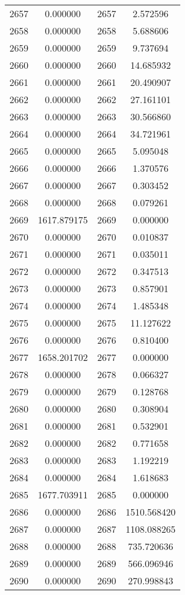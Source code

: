 \documentclass[12pt]{article}
\begin{document}
\begin{longtable}{@{}cccc@{}}
2657 & 0.000000 & 2657 & 2.572596 \\
2658 & 0.000000 & 2658 & 5.688606 \\
2659 & 0.000000 & 2659 & 9.737694 \\
2660 & 0.000000 & 2660 & 14.685932 \\
2661 & 0.000000 & 2661 & 20.490907 \\
2662 & 0.000000 & 2662 & 27.161101 \\
2663 & 0.000000 & 2663 & 30.566860 \\
2664 & 0.000000 & 2664 & 34.721961 \\
2665 & 0.000000 & 2665 & 5.095048 \\
2666 & 0.000000 & 2666 & 1.370576 \\
2667 & 0.000000 & 2667 & 0.303452 \\
2668 & 0.000000 & 2668 & 0.079261 \\
2669 & 1617.879175 & 2669 & 0.000000 \\
2670 & 0.000000 & 2670 & 0.010837 \\
2671 & 0.000000 & 2671 & 0.035011 \\
2672 & 0.000000 & 2672 & 0.347513 \\
2673 & 0.000000 & 2673 & 0.857901 \\
2674 & 0.000000 & 2674 & 1.485348 \\
2675 & 0.000000 & 2675 & 11.127622 \\
2676 & 0.000000 & 2676 & 0.810400 \\
2677 & 1658.201702 & 2677 & 0.000000 \\
2678 & 0.000000 & 2678 & 0.066327 \\
2679 & 0.000000 & 2679 & 0.128768 \\
2680 & 0.000000 & 2680 & 0.308904 \\
2681 & 0.000000 & 2681 & 0.532901 \\
2682 & 0.000000 & 2682 & 0.771658 \\
2683 & 0.000000 & 2683 & 1.192219 \\
2684 & 0.000000 & 2684 & 1.618683 \\
2685 & 1677.703911 & 2685 & 0.000000 \\
2686 & 0.000000 & 2686 & 1510.568420 \\
2687 & 0.000000 & 2687 & 1108.088265 \\
2688 & 0.000000 & 2688 & 735.720636 \\
2689 & 0.000000 & 2689 & 566.096946 \\
2690 & 0.000000 & 2690 & 270.998843 \\

\end{longtable}
\end{document}
